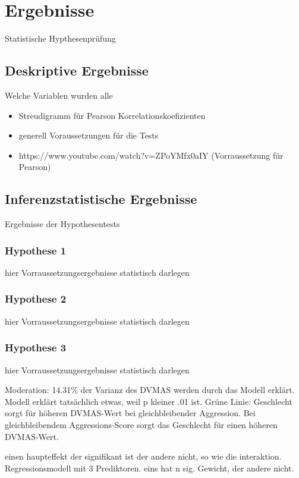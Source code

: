 \chapter{Ergebnisse}   \label{ch_4}
Statistische Hypthesenprüfung

\section{Deskriptive Ergebnisse}    \label{sec_4.1}
Welche Variablen wurden alle
\begin{itemize}
    \item Streudigramm für Pearson Korrelationskoefizienten
    \item generell Voraussetzungen für die Tests
    \item https://www.youtube.com/watch?v=ZPoYMfx0aIY (Vorraussetzung für Pearson)
\end{itemize}


\section{Inferenzstatistische Ergebnisse}    \label{sec_4.2}
Ergebnisse der Hypothesentests

\subsection{Hypothese 1}    \label{subsec_4.2.1}
hier Vorraussetzungsergebnisse statistisch darlegen

\subsection{Hypothese 2}    \label{subsec_4.2.2}
hier Vorraussetzungsergebnisse statistisch darlegen

\subsection{Hypothese 3}    \label{subsec_4.2.3}
hier Vorraussetzungsergebnisse statistisch darlegen

Moderation: 14.31\% der Varianz des DVMAS werden durch das Modell erklärt.
Modell erklärt tatsächlich etwas, weil p kleiner .01 ist.
Grüne Linie: Geschlecht sorgt für höheren DVMAS-Wert bei gleichbleibender Aggression. Bei gleichbleibendem Aggressions-Score sorgt das Geschlecht für einen höheren DVMAS-Wert.

einen haupteffekt der signifikant ist der andere nicht, so wie die interaktion. Regressionsmodell mit 3 Prediktoren. eins hat n sig. Gewicht, der andere nicht.

